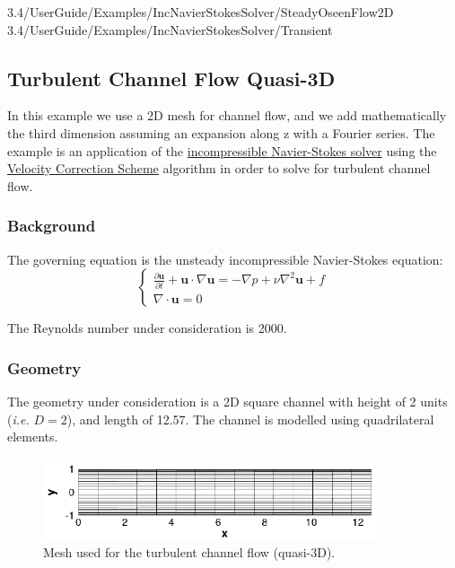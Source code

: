 \newpage


3.4/UserGuide/Examples/IncNavierStokesSolver/SteadyOseenFlow2D
3.4/UserGuide/Examples/IncNavierStokesSolver/Transient


\subsection{Turbulent Channel Flow Quasi-3D}
In this example we use a 2D mesh for channel flow, and we add mathematically the third dimension assuming an expansion along z with a Fourier series. The example is an application of the \hyperref[IncNSsolver]{incompressible Navier-Stokes solver} using the \hyperref[VCSscheme]{Velocity Correction Scheme} algorithm in order to solve for turbulent channel flow.

\subsubsection{Background}
The governing equation is the unsteady incompressible Navier-Stokes equation:
\begin{equation}
\begin{cases}
\frac{\partial \textbf{u}}{\partial t} + \textbf{u} \cdot \nabla \textbf{u} = - \nabla p + \nu \nabla^2 \textbf{u} + f \\
\nabla \cdot \textbf{u} = 0
\label{IncNS_equations}
\end{cases}
\end{equation}

The Reynolds number under consideration is 2000.

\subsubsection{Geometry}
The geometry under consideration is a 2D square channel with height of 2 units (\textit{i.e.} $D=2$), and length of 12.57. The channel is modelled using quadrilateral elements.
\begin{figure}
\begin{center}
\includegraphics[width=10cm]{Figures/ChanMesh.png}
\caption{Mesh used for the turbulent channel flow (quasi-3D).}
\end{center}
\end{figure}

